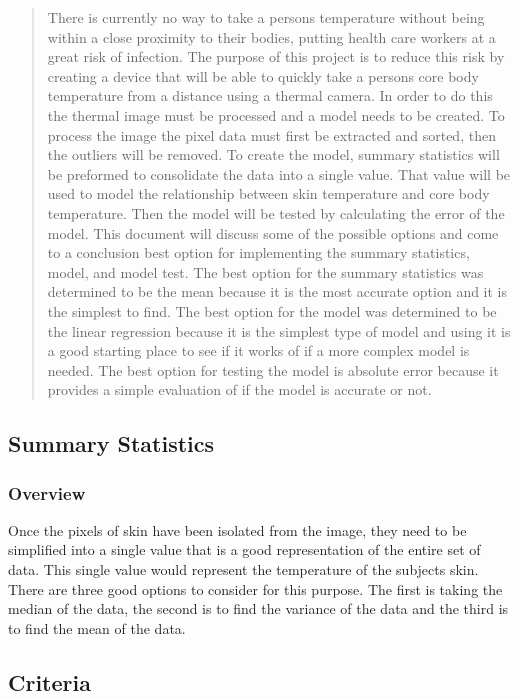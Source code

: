
	\begin{abstract}
	There is currently no way to take a persons temperature without being within a close proximity to their bodies, putting health care workers at a great risk of infection. The purpose of this project is to reduce this risk by creating a device that will be able to quickly take a persons core body temperature from a distance using a thermal camera. In order to do this the thermal image must be processed and a model needs to be created. To process the image the pixel data must first be extracted and sorted, then the outliers will be removed. To create the model, summary statistics will be preformed to consolidate the data into a single value. That value will be used to model the relationship between skin temperature and core body temperature. Then the model will be tested by calculating the error of the model. This document will discuss some of the possible options and come to a conclusion best option for implementing the summary statistics, model, and model test. The best option for the summary statistics was determined to be the mean because it is the most accurate option and it is the simplest to find. The best option for the model was determined to be the linear regression because it is the simplest type of model and using it is a good starting place to see if it works of if a more complex model is needed. The best option for testing the model is absolute error because it provides a simple evaluation of if the model is accurate or not.
	
	\end{abstract}
	
	\subsection*{Summary Statistics}
		\subsubsection*{Overview}
		Once the pixels of skin have been isolated from the image, they need to be simplified into a single value that is a good representation of the entire set of data. This single value would represent the temperature of the subjects skin. There are three good options to consider for this purpose. The first is taking the median of the data, the second is to find the variance of the data and the third is to find the mean of the data. 
		\subsection*{Criteria}
		
